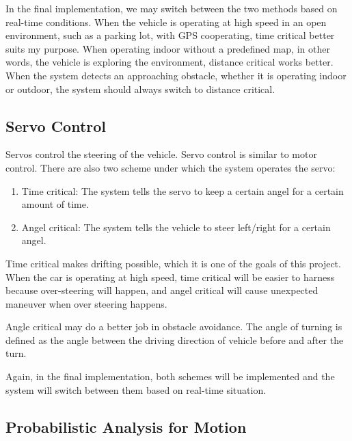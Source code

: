 \documentclass[compsoc,draftclsnofoot,onecolumn,10pt]{IEEEtran}
\begin{document}
In the final implementation, we may switch between the two methods based on 
real-time conditions. When the vehicle is operating at high speed in an open 
environment, such as a parking lot, with GPS cooperating, time critical better 
suits my purpose. When operating indoor without a predefined map, in other words, 
the vehicle is exploring the environment, distance critical works better. When the 
system detects an approaching obstacle, whether it is operating indoor or outdoor, 
the system should always switch to distance critical.\par

\subsection{Servo Control}
Servos control the steering of the vehicle. Servo control is similar to motor control. 
There are also two scheme under which the system operates the servo:
\begin{enumerate}
\item Time critical: The system tells the servo to keep a certain angel for a certain 
amount of time.
\item Angel critical: The system tells the vehicle to steer left/right for a certain 
angel. 
\end{enumerate}
Time critical makes drifting possible, which it is one of the goals of this project. 
When the car is operating at high speed, time critical will be easier to harness because 
over-steering will happen, and angel critical will cause unexpected maneuver when 
over steering happens.\par

Angle critical may do a better job in obstacle avoidance. The angle of turning is defined 
as the angle between the driving direction of vehicle before and after the turn.\par

Again, in the final implementation, both schemes will be implemented and the system will 
switch between them based on real-time situation.\par

\subsection{Probabilistic Analysis for Motion}
\end{document}
